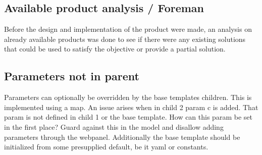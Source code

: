 


\subsection{Available product analysis / Foreman}
Before the design and implementation of the product were made, an analysis on already available products was done to see if there were any existing solutions that could be
used to satisfy the objective or provide a partial solution. 

\subsection{Parameters not in parent}
Parameters can optionally be overridden by the base templates children. This is implemented using a map.
An issue arises when in child 2 param c is added. That param is not defined in child 1 or the base template.
How can this param be set in the first place?
Guard against this in the model and disallow adding parameters through the webpanel.
Additionally the base template should be initialized from some presupplied default, be it yaml or constants.